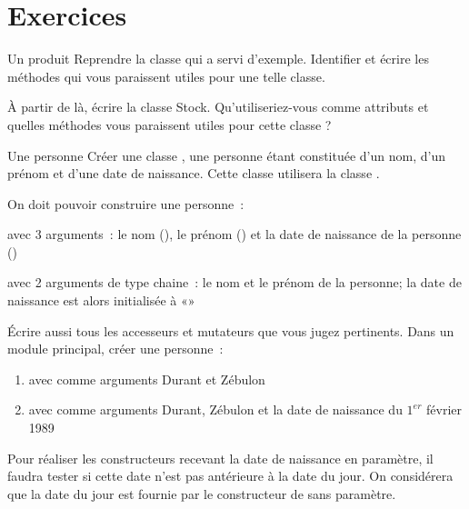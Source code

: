 \section{Exercices}

\begin{Exercice}{Un produit}
	Reprendre la classe  qui a servi
	d'exemple. Identifier et écrire les méthodes qui vous
	paraissent utiles pour une telle classe.
	
	À partir de là, écrire la classe Stock. Qu'utiliseriez-vous 
	comme attributs et quelles méthodes vous paraissent utiles pour
	cette classe ?
\end{Exercice}

\begin{Exercice}{Une personne}
	Créer une classe , une personne étant
	constituée d'un nom, d'un prénom et
	d'une date de naissance. Cette classe utilisera la
	classe .

	On doit pouvoir construire une personne~:

	\begin{liste}
		\item 
			avec 3 arguments~: le nom (), le prénom
			() et la date de naissance de la personne
			()
		\item 
			avec 2 arguments de type chaine~: le nom et le prénom de la personne; la
			date de naissance est alors initialisée à «»
	\end{liste}

	Écrire aussi tous les accesseurs et mutateurs que vous jugez
	pertinents. Dans un module principal, créer une personne~:

	\begin{enumerate}[label=\alph*)]
		\item 
			avec comme arguments {\textquotedbl}Durant{\textquotedbl} et
			{\textquotedbl}Zébulon{\textquotedbl}
		\item 
			avec comme arguments {\textquotedbl}Durant{\textquotedbl},
			{\textquotedbl}Zébulon{\textquotedbl} et la date de naissance du
			$1^{er}$ février 1989
	\end{enumerate}

	Pour réaliser les constructeurs recevant la date de naissance en
	paramètre, il faudra tester si cette date n’est pas antérieure à la
	date du jour. On considérera que la date 
	du jour est fournie par le constructeur de
	 sans paramètre.
\end{Exercice}

